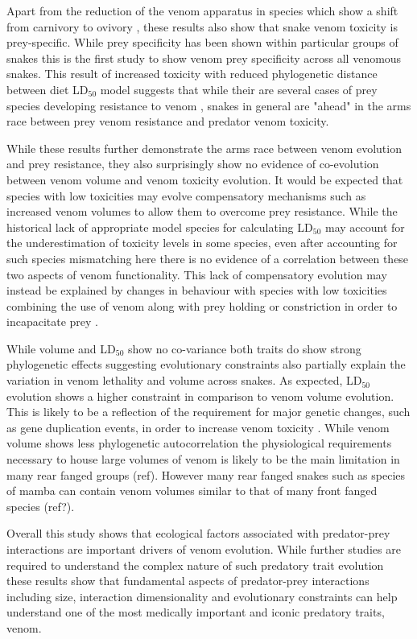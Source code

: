 Apart from the reduction of the venom apparatus in species which show a shift from carnivory to ovivory \citep{li2005eggs}, these results also show that snake venom toxicity is prey-specific. While prey specificity has been shown within particular groups of snakes \citep{barlow2009coevolution,richards2012venom,daltry1996diet} this is the first study to show venom prey specificity across all venomous snakes. This result of increased toxicity with reduced phylogenetic distance between diet LD$_{50}$ model suggests that while their are several cases of prey species developing resistance to venom \citep{lillywhite2002patterns}, snakes in general are "ahead" in the arms race between prey venom resistance and predator venom toxicity.


While these results further demonstrate the arms race between venom evolution and prey resistance, they also surprisingly show no evidence of co-evolution between venom volume and venom toxicity evolution. It would be expected that species with low toxicities may evolve compensatory mechanisms such as increased venom volumes to allow them to overcome prey resistance. While the historical lack of appropriate model species for calculating LD$_{50}$ may account for the underestimation of toxicity levels in some species, even after accounting for such species mismatching here there is no evidence of a correlation between these two aspects of venom functionality. This lack of compensatory evolution may instead be explained by changes in behaviour with species with low toxicities combining the use of venom along with prey holding or constriction in order to incapacitate prey \citep{shine1985prey}.


While volume and LD$_{50}$ show no co-variance both traits do show strong phylogenetic effects suggesting evolutionary constraints also partially explain the variation in venom lethality and volume across snakes. As expected, LD$_{50}$ evolution shows a higher constraint in comparison to venom volume evolution. This is likely to be a reflection of the requirement for major genetic changes, such as gene duplication events, in order to increase venom toxicity \citep{vonk2013king}. While venom volume shows less phylogenetic autocorrelation the physiological requirements necessary to house large volumes of venom is likely to be the main limitation in many rear fanged groups (ref). However many rear fanged snakes such as species of mamba can contain venom volumes similar to that of many front fanged species (ref?).


Overall this study shows that ecological factors associated with predator-prey interactions are important drivers of venom evolution. While further studies are required to understand the complex nature of such predatory trait evolution these results show that fundamental aspects of predator-prey interactions including size, interaction dimensionality and evolutionary constraints can help understand one of the most medically important and iconic predatory traits, venom.



%
%

